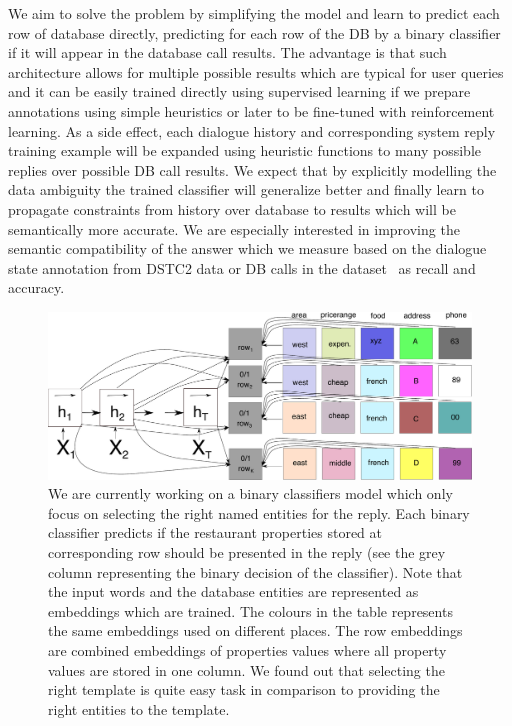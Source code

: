 \documentclass[11pt]{article}
\begin{document}
We aim to solve the problem by simplifying the model and learn to predict each row of database directly, predicting for each row of the DB by a binary classifier if it will appear in the database call results. 
The advantage is that such architecture allows for multiple possible results which are typical for user queries and it can be easily trained directly using supervised learning if we prepare annotations using simple heuristics or later to be fine-tuned with reinforcement learning.
As a side effect, each dialogue history and corresponding system reply training example will be expanded using heuristic functions to many possible replies over possible DB call results.
We expect that by explicitly modelling the data ambiguity the trained classifier will generalize better and finally learn to propagate constraints from history over database to results which will be semantically more accurate.
We are especially interested in improving the semantic compatibility of the answer which we measure based on the dialogue state annotation from DSTC2 data or DB calls in the dataset~\cite{platek2016wochat} as recall and accuracy.
\begin{figure}[ht]
    \centering
    \includegraphics[width=1.0\linewidth]{e2end_dbclassifiers}
    \caption{We are currently working on a binary classifiers model which only focus on selecting the right named entities for the reply. 
    Each binary classifier predicts if the restaurant properties stored at corresponding row should be presented in the reply (see the grey column representing the binary decision of the classifier). 
    Note that the input words and the database entities are represented as embeddings which are trained. 
    The colours in the table represents the same embeddings used on different places.
    The row embeddings are combined embeddings of properties values where all property values are stored in one column.
    We found out that selecting the right template is quite easy task in comparison to providing the right entities to the template.
    }
\label{fig:e2end_entities}
\end{figure}
\end{document}
